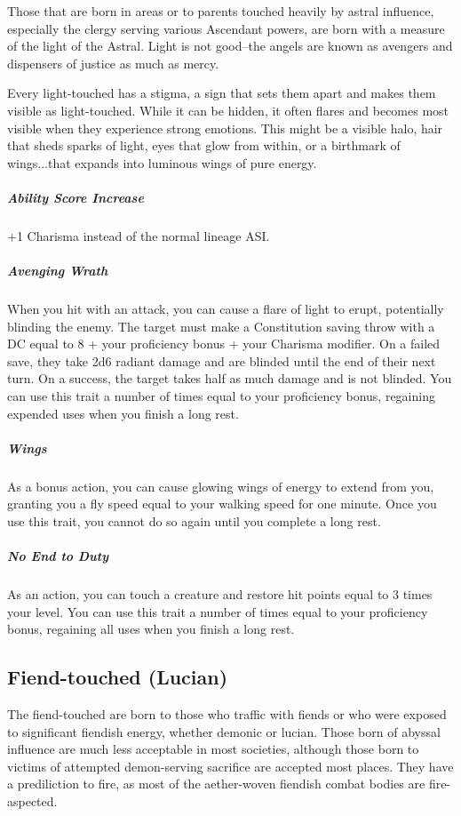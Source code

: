 Those that are born in areas or to parents touched heavily by astral influence, especially the clergy serving various Ascendant powers, are born with a measure of the light of the Astral. Light is not good--the angels are known as avengers and dispensers of justice as much as mercy.

Every light-touched has a stigma, a sign that sets them apart and makes them visible as light-touched. While it can be hidden, it often flares and becomes most visible when they experience strong emotions. This might be a visible halo, hair that sheds sparks of light, eyes that glow from within, or a birthmark of wings...that expands into luminous wings of pure energy.

\subparagraph*{Ability Score Increase}  +1 Charisma instead of the normal lineage ASI.

\subparagraph*{Avenging Wrath}  When you hit with an attack, you can cause a flare of light to erupt, potentially blinding the enemy. The target must make a Constitution saving throw with a DC equal to 8 + your proficiency bonus + your Charisma modifier. On a failed save, they take 2d6 radiant damage and are blinded until the end of their next turn. On a success, the target takes half as much damage and is not blinded. You can use this trait a number of times equal to your proficiency bonus, regaining expended uses when you finish a long rest.

\subparagraph*{Wings}  As a bonus action, you can cause glowing wings of energy to extend from you, granting you a fly speed equal to your walking speed for one minute. Once you use this trait, you cannot do so again until you complete a long rest.

\subparagraph*{No End to Duty}  As an action, you can touch a creature and restore hit points equal to 3 times your level. You can use this trait a number of times equal to your proficiency bonus, regaining all uses when you finish a long rest.

\subsection{Fiend-touched (Lucian)}

The fiend-touched are born to those who traffic with fiends or who were exposed to significant fiendish energy, whether demonic or lucian. Those born of abyssal influence are much less acceptable in most societies, although those born to victims of attempted demon-serving sacrifice are accepted most places. They have a prediliction to fire, as most of the aether-woven fiendish combat bodies are fire-aspected.

